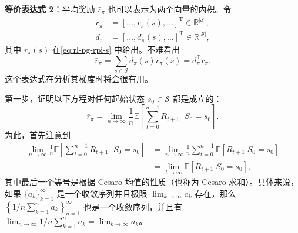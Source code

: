 \textbf{等价表达式 2}：平均奖励 $\bar{r}_{\pi}$ 也可以表示为两个向量的内积。令
\begin{align}
r_{\pi} &= [\dots, r_{\pi}(s), \dots]^{\mathrm{T}} \in \mathbb{R}^{|\mathcal{S}|}, \\
d_{\pi} &= [\dots, d_{\pi}(s), \dots]^{\mathrm{T}} \in \mathbb{R}^{|\mathcal{S}|},
\end{align}
其中 $r_{\pi}(s)$ 在\cref{eq:rl-pg-rpi-s} 中给出。不难看出
\begin{equation}
\bar{r}_{\pi} = \sum_{s \in \mathcal{S}} d_{\pi}(s) r_{\pi}(s) = d_{\pi}^{\mathrm{T}} r_{\pi}.
\end{equation}
这个表达式在分析其梯度时将会很有用。

\begin{note}
\label{box:rl-pg-9-1}
第一步，证明以下方程对任何起始状态 $s_0 \in \mathcal{S}$ 都是成立的：
\begin{equation}
\bar{r}_{\pi} = \lim_{n \to \infty} \frac{1}{n} \mathbb{E}\left[ \sum_{t=0}^{n-1} R_{t+1} \,\Big|\, S_0 = s_0 \right].
\label{eq:rl-pg-rbar-s0}
\end{equation}
为此，首先注意到
\begin{equation}
\begin{aligned}
\lim_{n \to \infty} \frac{1}{n} \mathbb{E}\left[ \sum_{t=0}^{n-1} R_{t+1} \,\Big|\, S_0 = s_0 \right]
&= \lim_{n \to \infty} \frac{1}{n} \sum_{t=0}^{n-1} \mathbb{E}\left[ R_{t+1} | S_0 = s_0 \right] \\
&= \lim_{t \to \infty} \mathbb{E}\left[ R_{t+1} | S_0 = s_0 \right],
\end{aligned}
\label{eq:rl-pg-cesaro}
\end{equation}
其中最后一个等号是根据 Cesaro 均值的性质（也称为 Cesaro 求和）。具体来说，如果 $\{a_k\}_{k=1}^{\infty}$ 是一个收敛序列并且极限 $\lim_{k\to\infty}a_k$ 存在，那么 $\left\{1/n\sum_{k=1}^{n}a_k\right\}_{n=1}^{\infty}$ 也是一个收敛序列，并且有 $\lim_{n\to\infty}1/n\sum_{k=1}^{n}a_k=\lim_{k\to\infty}a_k$。


\end{note}
